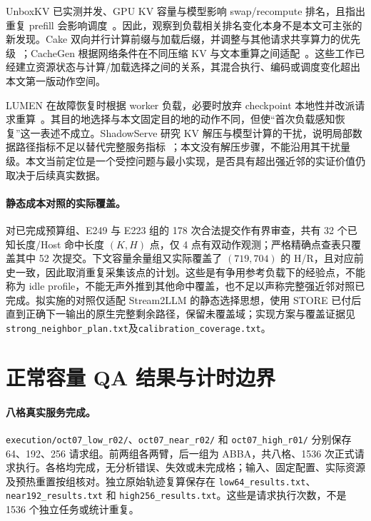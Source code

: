 \documentclass[UTF8,fontset=fandol,a4paper,10pt]{ctexart}
\newcommand{\code}[1]{\nolinkurl{#1}}
\begin{document}
UnboxKV 已实测并发、GPU KV 容量与模型影响 swap/recompute 排名，且指出重复 prefill 会影响调度~\cite{unboxkv}。因此，观察到负载相关排名变化本身不是本文可主张的新发现。Cake 双向并行计算前缀与加载后缀，并调整与其他请求共享算力的优先级~\cite{cake}；CacheGen 根据网络条件在不同压缩 KV 与文本重算之间适配~\cite{cachegen}。这些工作已经建立资源状态与计算/加载选择之间的关系，其混合执行、编码或调度变化超出本文第一版动作空间。

LUMEN 在故障恢复时根据 worker 负载，必要时放弃 checkpoint 本地性并改派请求重算~\cite{lumen}。其目的地选择与本文固定目的地的动作不同，但使“首次负载感知恢复”这一表述不成立。ShadowServe 研究 KV 解压与模型计算的干扰，说明局部数据路径指标不足以替代完整服务指标~\cite{shadowserve}；本文没有解压步骤，不能沿用其干扰量级。本文当前定位是一个受控问题与最小实现，是否具有超出强近邻的实证价值仍取决于后续真实数据。

\paragraph{静态成本对照的实际覆盖。}
对已完成预算组、E249 与 E223 组的 178 次合法提交作有界审查，共有 32 个已知长度/Host 命中长度 $(K,H)$ 点，仅 4 点有双动作观测；严格精确点查表只覆盖其中 52 次提交。下文容量余量组又实际覆盖了 $(719,704)$ 的 H/R，且对应前史一致，因此取消重复采集该点的计划。这些是有争用参考负载下的经验点，不能称为 idle profile，不能无声外推到其他命中覆盖，也不足以声称完整强近邻对照已完成。拟实施的对照仅适配 Stream2LLM 的静态选择思想，使用 STORE 已付后直到正确下一输出的原生完整剩余路径，保留未覆盖域；实现方案与覆盖证据见\code{strong_neighbor_plan.txt}及\code{calibration_coverage.txt}。

\section{正常容量 QA 结果与计时边界}
\label{sec:results}
\paragraph{八格真实服务完成。}
\code{execution/oct07_low_r02/}、\code{oct07_near_r02/} 和 \code{oct07_high_r01/} 分别保存 64、192、256 请求组。前两组各两臂，后一组为 ABBA，共八格、1536 次正式请求执行。各格均完成，无分析错误、失效或未完成格；输入、固定配置、实际资源及预热重置按组核对。独立原始轨迹复算保存在 \code{low64_results.txt}、\code{near192_results.txt} 和 \code{high256_results.txt}。这些是请求执行次数，不是 1536 个独立任务或统计重复。
\end{document}
